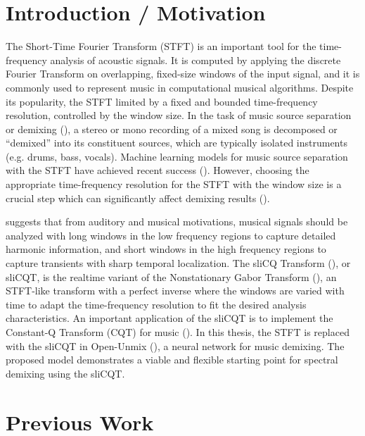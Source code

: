 \documentclass[letter,12pt]{article}
\title{\ThesisTitle}
\author{Sevag Hanssian, sevag.hanssian@mail.mcgill.ca}
\begin{document}
\maketitle

\section{Introduction / Motivation}


The Short-Time Fourier Transform (STFT) is an important tool for the time-frequency analysis of acoustic signals. It is computed by applying the discrete Fourier Transform on overlapping, fixed-size windows of the input signal, and it is commonly used to represent music in computational musical algorithms. Despite its popularity, the STFT limited by a fixed and bounded time-frequency resolution, controlled by the window size. In the task of music source separation or demixing (\cite{musicsepgood}), a stereo or mono recording of a mixed song is decomposed or ``demixed'' into its constituent sources, which are typically isolated instruments (e.g. drums, bass, vocals). Machine learning models for music source separation with the STFT have achieved recent success (\cite{sisec2018}). However, choosing the appropriate time-frequency resolution for the STFT with the window size is a crucial step which can significantly affect demixing results (\cite{tftradeoff1}).

 \textcite{doerflerphd} suggests that from auditory and musical motivations, musical signals should be analyzed with long windows in the low frequency regions to capture detailed harmonic information, and short windows in the high frequency regions to capture transients with sharp temporal localization. The sliCQ Transform (\cite{invertiblecqt}), or sliCQT, is the realtime variant of the Nonstationary Gabor Transform (\cite{balazs}), an STFT-like transform with a perfect inverse where the windows are varied with time to adapt the time-frequency resolution to fit the desired analysis characteristics. An important application of the sliCQT is to implement the Constant-Q Transform (CQT) for music (\cite{jbrown}). In this thesis, the STFT is replaced with the sliCQT in Open-Unmix (\cite{umx}), a neural network for music demixing. The proposed model demonstrates a viable and flexible starting point for spectral demixing using the sliCQT.

\section{Previous Work}
\end{document}
